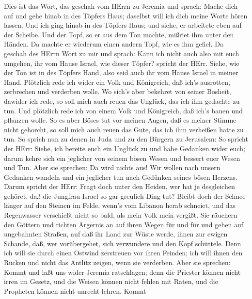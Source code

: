  Dies ist das Wort, das geschah vom HErrn zu Jeremia und
sprach:  Mache dich auf und gehe hinab in des Töpfers Haus;
daselbst will ich dich meine Worte hören lassen.  Und ich
ging hinab in des Töpfers Haus; und siehe, er arbeitete eben auf der
Scheibe.  Und der Topf, so er aus dem Ton machte, mißriet
ihm unter den Händen. Da machte er wiederum einen andern Topf, wie es
ihm gefiel.  Da geschah des HErrn Wort zu mir und sprach:
 Kann ich nicht auch also mit euch umgehen, ihr vom Hause
Israel, wie dieser Töpfer? spricht der HErr. Siehe, wie der Ton ist in
des Töpfers Hand, also seid auch ihr vom Hause Israel in meiner Hand.
 Plötzlich rede ich wider ein Volk und Königreich, daß ich's
ausrotten, zerbrechen und verderben wolle.  Wo sich's aber
bekehret von seiner Bosheit, dawider ich rede, so soll mich auch reuen
das Unglück, das ich ihm gedachte zu tun.  Und plötzlich
rede ich von einem Volk und Königreich, daß ich's bauen und pflanzen
wolle.  So es aber Böses tut vor meinen Augen, daß es
meiner Stimme nicht gehorcht, so soll mich auch reuen das Gute, das ich
ihm verheißen hatte zu tun.  So sprich nun zu denen in Juda
und zu den Bürgern zu Jerusalem: So spricht der HErr: Siehe, ich bereite
euch ein Unglück zu und habe Gedanken wider euch; darum kehre sich ein
jeglicher von seinem bösen Wesen und bessert euer Wesen und Tun.
 Aber sie sprechen: Da wird nichts aus! Wir wollen nach
unsern Gedanken wandeln und ein jeglicher tun nach Gedünken seines bösen
Herzens.  Darum spricht der HErr: Fragt doch unter den
Heiden, wer hat je desgleichen gehöret, daß die Jungfrau Israel so gar
greulich Ding tut?  Bleibt doch der Schnee länger auf den
Steinen im Felde, wenn's vom Libanon herab schneiet, und das Regenwasser
verschießt nicht so bald, als mein Volk mein vergißt.  Sie
räuchern den Göttern und richten Ärgernis an auf ihren Wegen für und für
und gehen auf ungebahnten Straßen,  auf daß ihr Land zur
Wüste werde, ihnen zur ewigen Schande, daß, wer vorübergehet, sich
verwundere und den Kopf schüttele.  Denn ich will sie durch
einen Ostwind zerstreuen vor ihren Feinden; ich will ihnen den Rücken
und nicht das Antlitz zeigen, wenn sie verderben.  Aber sie
sprechen: Kommt und laßt uns wider Jeremia ratschlagen; denn die
Priester können nicht irren im Gesetz, und die Weisen können nicht
fehlen mit Raten, und die Propheten können nicht unrecht lehren. Kommt
